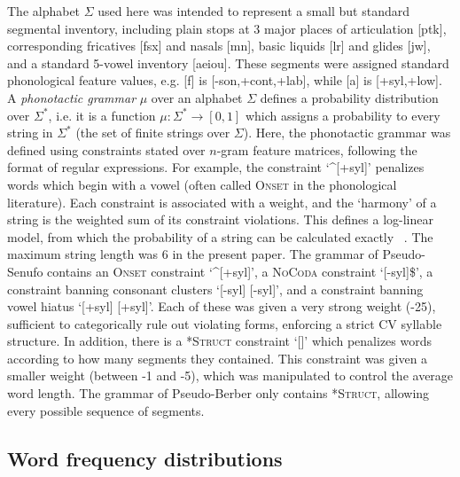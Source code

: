 \documentclass[11pt]{article}
\begin{document}
The alphabet $\Sigma$ used here was intended to represent a small but standard segmental inventory, including plain stops at 3 major places of articulation [ptk], corresponding fricatives [fsx] and nasals [mn\engma], basic liquids [lr] and glides [jw], and a standard 5-vowel inventory [aeiou]. These segments were assigned standard phonological feature values, e.g. [f] is [-son,+cont,+lab], while [a] is [+syl,+low]. %
A \textit{phonotactic grammar} $\mu$ over an alphabet $\Sigma$ defines a probability distribution over $\Sigma^*$, i.e. it is a function $\mu : \Sigma^* \rightarrow [0,1]$ which assigns a probability to every string in $\Sigma^*$ (the set of finite strings over $\Sigma$). Here, the phonotactic grammar was defined using constraints stated over $n$-gram feature matrices, following the format of regular expressions. For example, the constraint `\textasciicircum[+syl]' penalizes words which begin with a vowel (often called \textsc{Onset} in the phonological literature). Each constraint is associated with a weight, and the `harmony' of a string is the weighted sum of its constraint violations. This defines a log-linear model, from which the probability of a string can be calculated exactly ~\cite{Hayes08a}. The maximum string length was 6 in the present paper. The grammar of Pseudo-Senufo contains an \textsc{Onset} constraint `\textasciicircum[+syl]', a \textsc{NoCoda} constraint `[-syl]\$', a constraint banning consonant clusters `[-syl] [-syl]', and a constraint banning vowel hiatus `[+syl] [+syl]'. Each of these was given a very strong weight (-25), sufficient to categorically rule out violating forms, enforcing a strict CV syllable structure. In addition, there is a \textsc{*Struct} constraint `[]' which penalizes words according to how many segments they contained. This constraint was given a smaller weight (between -1 and -5), which was manipulated to control the average word length. The grammar of Pseudo-Berber only contains \textsc{*Struct}, allowing every possible sequence of segments. 

\subsection{Word frequency distributions}
\end{document}
